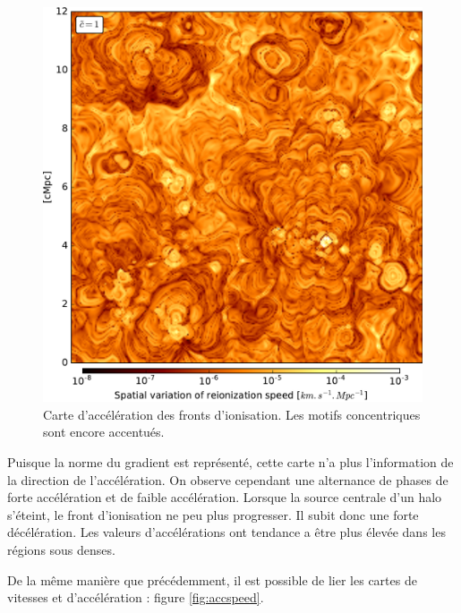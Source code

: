 \begin{figure}[htpb]
        \includegraphics[width=.95\linewidth]{img/04_mapreio/map_acc_c1.pdf} 
        \caption{Carte d'accélération des fronts d'ionisation.
        Les motifs concentriques sont encore accentués.
        }
 		\label{fig:accz}
\end{figure}

Puisque la norme du gradient est représenté, cette carte n'a plus l'information de la direction de l'accélération.
On observe cependant une alternance de phases de forte accélération et de faible accélération.
Lorsque la source centrale d'un halo s’éteint, le front d'ionisation ne peu plus progresser.
Il subit donc une forte décélération.
Les valeurs d'accélérations ont tendance a être plus élevée dans les régions sous denses.



De la même manière que précédemment, il est possible de lier les cartes de vitesses et d'accélération : figure \ref{fig:accspeed}.

